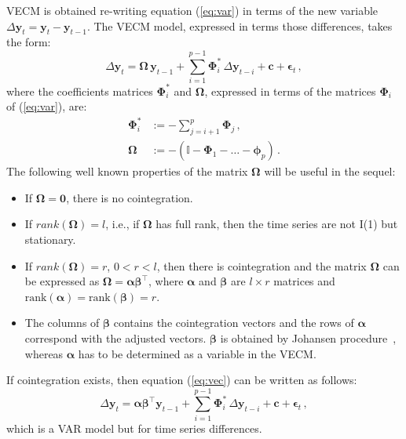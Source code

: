 VECM is obtained re-writing equation (\ref{eq:var}) in terms of the new
variable $\Delta\mathbf{y}_t=\mathbf{y}_t-\mathbf{y}_{t-1}$.
The VECM model, expressed in terms those differences, takes the form:
\begin{equation}\label{eq:vec}
\Delta \mathbf{y}_t 
= \boldsymbol{\Omega}\,\mathbf{y}_{t-1}
  + \sum_{i=1}^{p-1} \boldsymbol{\Phi}_i^*\,\Delta\mathbf{y}_{t-i}
  + \mathbf{c} + \boldsymbol{\epsilon}_t\,,
\end{equation}
\noindent
where the coefficients matrices $\boldsymbol{\Phi}_i^*$ and 
$\boldsymbol{\Omega}$, expressed in terms of the matrices
$\boldsymbol{\Phi}_i$ of (\ref{eq:var}), are:
\begin{align*}
\boldsymbol{\Phi}_i^* 
&:= -\sum_{j=i+1}^{p}\boldsymbol{\Phi}_j\,, \\
\boldsymbol{\Omega}
&:= -\left( \mathbb{I} - \boldsymbol{\Phi}_1 - \dots 
    - \boldsymbol{\phi}_p \right)\,. 
\end{align*}
The following well known properties of the matrix $\boldsymbol{\Omega}$
\cite{johansen1995} will be useful in the sequel:
\begin{itemize}
\item
If $\boldsymbol{\Omega} = \mathbf{0}$, there is no cointegration.
\item 
If $rank(\boldsymbol{\Omega})=l$, i.e., if $\boldsymbol{\Omega}$ has
full rank, then the time series are not I(1) but stationary.
\item
If $rank(\boldsymbol{\Omega})=r$, $0<r<l$, then there is cointegration
and the matrix $\boldsymbol{\Omega}$ can be expressed as
$\boldsymbol{\Omega}=\boldsymbol{\alpha\beta}^\top$, where $\boldsymbol{\alpha}$
and $\boldsymbol{\beta}$ are
$l\times r$ matrices and
$\text{rank}(\boldsymbol{\alpha})=\text{rank}(\boldsymbol{\beta})=r$.
\item
The columns of $\boldsymbol{\beta}$ contains the cointegration vectors and the rows of
$\boldsymbol{\alpha}$ correspond with the adjusted vectors. 
$\boldsymbol{\beta}$ is obtained by Johansen procedure~\cite{johansen1988},
whereas $\boldsymbol{\alpha}$ has to be determined as a variable in the VECM.
\end{itemize}

If cointegration exists, then equation (\ref{eq:vec}) can be written
as follows:
\begin{equation}\label{eq:vecfull}
\Delta\mathbf{y}_t 
= \boldsymbol{\alpha\beta}^\top\mathbf{y}_{t-1} 
  + \sum_{i=1}^{p-1}\boldsymbol{\Phi}_i^*\,\Delta\mathbf{y}_{t-i}
  + \mathbf{c} + \boldsymbol{\epsilon}_t\,,
\end{equation}
\noindent
which is a VAR model but for time series differences.

